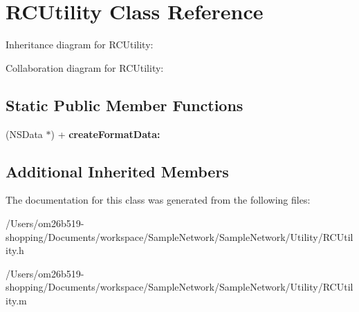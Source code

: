 \hypertarget{interface_r_c_utility}{\section{R\-C\-Utility Class Reference}
\label{interface_r_c_utility}
}


Inheritance diagram for R\-C\-Utility\-:


Collaboration diagram for R\-C\-Utility\-:
\subsection*{Static Public Member Functions}
\begin{DoxyCompactItemize}
\item 
\hypertarget{interface_r_c_utility_aab66f4f0fb550d61f59ac244bbb9e3bd}{(N\-S\-Data $\ast$) + {\bfseries create\-Format\-Data\-:}}\label{interface_r_c_utility_aab66f4f0fb550d61f59ac244bbb9e3bd}

\end{DoxyCompactItemize}
\subsection*{Additional Inherited Members}


The documentation for this class was generated from the following files\-:\begin{DoxyCompactItemize}
\item 
/\-Users/om26b519-\/shopping/\-Documents/workspace/\-Sample\-Network/\-Sample\-Network/\-Utility/R\-C\-Utility.\-h\item 
/\-Users/om26b519-\/shopping/\-Documents/workspace/\-Sample\-Network/\-Sample\-Network/\-Utility/R\-C\-Utility.\-m\end{DoxyCompactItemize}
